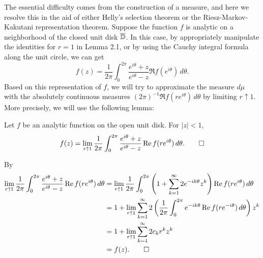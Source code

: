 \documentclass[12pt]{article}
\begin{document}
The essential difficulty comes from the construction of a measure, and here we resolve this in the aid of either Helly's selection theorem or the Riesz-Markov-Kakutani representation theorem.
Suppose the function $f$ is analytic on a neighborhood of the closed unit disk $\bar\D$.
In this case, by appropriately manipulate the identities for $r=1$ in Lemma 2.1, or by using the Cauchy integral formula along the unit circle, we can get
\[f(z)=\frac1{2\pi}\int_0^{2\pi}\frac{e^{i\theta}+z}{e^{i\theta}-z}\Re f(e^{i\theta})\,d\theta.\]
Based on this representation of $f$, we will try to approximate the measure $d\mu$ with the absolutely continuous measures $(2\pi)^{-1}\Re f(re^{i\theta})\,d\theta$ by limiting $r\uparrow1$.
More precisely, we will use the following lemma:
\begin{lem}
Let $f$ be an analytic function on the open unit disk.
For $|z|<1$,
\[f(z)=\lim_{r\uparrow1}\frac1{2\pi}\int_0^{2\pi}\frac{e^{i\theta}+z}{e^{i\theta}-z}\Re f(re^{i\theta})\,d\theta.\qedhere\]
\end{lem}
\begin{pf}
By 
\begin{align*}
\lim_{r\uparrow1}\frac1{2\pi}\int_0^{2\pi}\frac{e^{i\theta}+z}{e^{i\theta}-z}\Re f(re^{i\theta})\,d\theta
&=\lim_{r\uparrow1}\frac1{2\pi}\int_0^{2\pi}\left(1+\sum_{k=1}^\infty2e^{-ik\theta}z^k\right)\Re f(re^{i\theta})\,d\theta\\
&=1+\lim_{r\uparrow1}\sum_{k=1}^\infty2\left(\frac1{2\pi}\int_0^{2\pi}e^{-ik\theta}\Re f(re^{-i\theta})\,d\theta\right)z^k\\
&=1+\lim_{r\uparrow1}\sum_{k=1}^\infty2c_kr^kz^k\\
&=f(z).\qedhere
\end{align*}
\end{pf}
\end{document}
